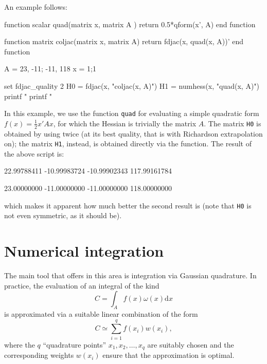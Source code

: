 An example follows:
\begin{code}
function scalar quad(matrix x, matrix A )
    return 0.5*qform(x', A)
end function

function matrix coljac(matrix x, matrix A)
    return fdjac(x, quad(x, A))'
end function

A = {23, -11; -11, 118}
x = {1;1}

set fdjac_quality 2
H0 = fdjac(x, "coljac(x, A)")
H1 = numhess(x, "quad(x, A)")
printf "\n%
printf "\n%
\end{code}
In this example, we use the function \texttt{quad} for evaluating a
simple quadratic form $f(x) = \frac{1}{2} x'Ax$, for which the Hessian
is trivially the matrix $A$. The matrix \texttt{H0} is obtained by
using  twice (at its best quality, that is with Richardson
extrapolation on); the matrix \texttt{H1}, instead, is obtained
directly via the  function. The result of the above
script is:
\begin{code}
   22.99788411  -10.99983724
  -10.99902343  117.99161784

   23.00000000  -11.00000000
  -11.00000000  118.00000000
\end{code}
which makes it apparent how much better the second result is (note
that \texttt{H0} is not even symmetric, as it should be). 

\section{Numerical integration}
\label{sec:numint}

The main tool that  offers in this area is integration via
Gaussian quadrature. In practice, the evaluation of an integral of the
kind
\begin{equation}
  \label{eq:quadint}
  C = \int_{A} f(x) \omega(x) \mathrm{d}x
\end{equation}
is approximated via a suitable linear combination of the form
\begin{equation}
  \label{eq:quadsum}
  C \simeq \sum_{i=1}^q f(x_i) w(x_i) ,
\end{equation}
where the $q$ ``quadrature points'' $x_1, x_2, \ldots, x_q$ are
suitably chosen and the corresponding weights $w(x_i)$ ensure that the
approximation is optimal.

